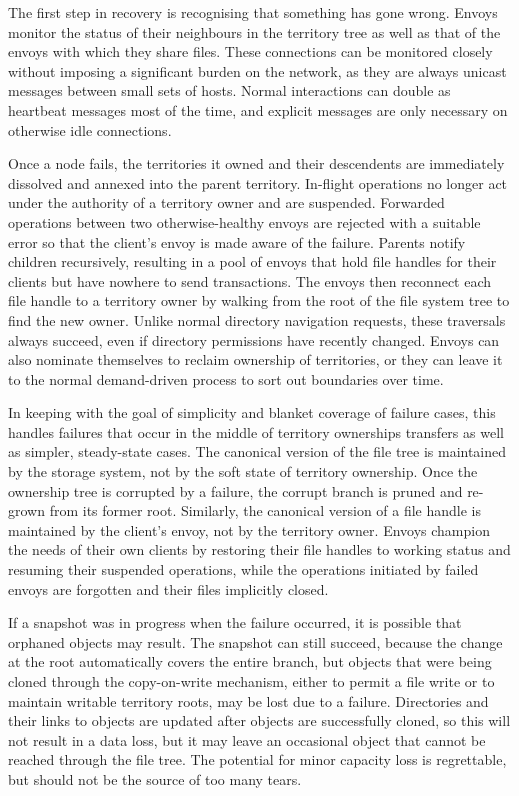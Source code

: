 The first step in recovery is recognising that something has gone wrong. Envoys monitor the status of their neighbours in the territory tree as well as that of the envoys with which they share files. These connections can be monitored closely without imposing a significant burden on the network, as they are always unicast messages between small sets of hosts. Normal interactions can double as heartbeat messages most of the time, and explicit messages are only necessary on otherwise idle connections.

Once a node fails, the territories it owned and their descendents are immediately dissolved and annexed into the parent territory. In-flight operations no longer act under the authority of a territory owner and are suspended. Forwarded operations between two otherwise-healthy envoys are rejected with a suitable error so that the client's envoy is made aware of the failure. Parents notify children recursively, resulting in a pool of envoys that hold file handles for their clients but have nowhere to send transactions. The envoys then reconnect each file handle to a territory owner by walking from the root of the file system tree to find the new owner. Unlike normal directory navigation requests, these traversals always succeed, even if directory permissions have recently changed. Envoys can also nominate themselves to reclaim ownership of territories, or they can leave it to the normal demand-driven process to sort out boundaries over time.

In keeping with the goal of simplicity and blanket coverage of failure cases, this handles failures that occur in the middle of territory ownerships transfers as well as simpler, steady-state cases. The canonical version of the file tree is maintained by the storage system, not by the soft state of territory ownership. Once the ownership tree is corrupted by a failure, the corrupt branch is pruned and re-grown from its former root. Similarly, the canonical version of a file handle is maintained by the client's envoy, not by the territory owner. Envoys champion the needs of their own clients by restoring their file handles to working status and resuming their suspended operations, while the operations initiated by failed envoys are forgotten and their files implicitly closed.

If a snapshot was in progress when the failure occurred, it is possible that orphaned objects may result. The snapshot can still succeed, because the change at the root automatically covers the entire branch, but objects that were being cloned through the copy-on-write mechanism, either to permit a file write or to maintain writable territory roots, may be lost due to a failure. Directories and their links to objects are updated after objects are successfully cloned, so this will not result in a data loss, but it may leave an occasional object that cannot be reached through the file tree. The potential for minor capacity loss is regrettable, but should not be the source of too many tears.

